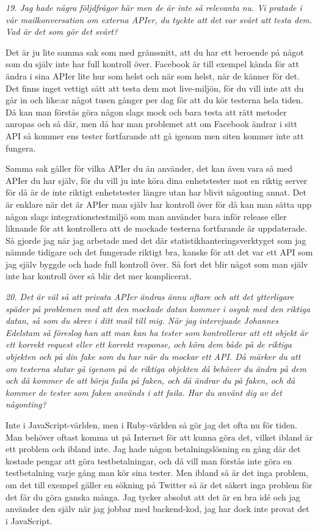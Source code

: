 \documentclass[11pt]{article}
\begin{document}
\emph{19. Jag hade några följdfrågor här men de är inte så relevanta nu. Vi pratade i vår mailkonversation om externa APIer, du tyckte att det var svårt att testa dem. Vad är det som gör det svårt?}

Det är ju lite samma sak som med gränssnitt, att du har ett beroende på något som du själv inte har full kontroll över. Facebook är till exempel kända för att ändra i sina APIer lite hur som helst och när som helst, när de känner för det. Det finns inget vettigt sätt att testa dem mot live-miljön, för du vill inte att du går in och like:ar något tusen gånger per dag för att du kör testerna hela tiden. Då kan man förstås göra någon slags mock och bara testa att rätt metoder anropas och så där, men då har man problemet att om Facebook ändrar i sitt API så kommer ens tester fortfarande att gå igenom men siten kommer inte att fungera.

Samma sak gäller för vilka APIer du än använder, det kan även vara så med APIer du har själv, för du vill ju inte köra dina enhetstester mot en riktig server för då är de inte riktigt enhetstester längre utan har blivit någonting annat. Det är enklare när det är APIer man själv har kontroll över för då kan man sätta upp någon slags integrationstestmiljö som man använder bara inför release eller liknande för att kontrollera att de mockade testerna fortfarande är uppdaterade. Så gjorde jag när jag arbetade med det där statistikhanteringsverktyget som jag nämnde tidigare och det fungerade riktigt bra, kanske för att det var ett API som jag själv byggde och hade full kontroll över. Så fort det blir något som man själv inte har kontroll över så blir det mer komplicerat.

\emph{20. Det är väl så att privata APIer ändras ännu oftare och att det ytterligare späder på problemen med att den mockade datan kommer i osynk med den riktiga datan, så som du skrev i ditt mail till mig. När jag intervjuade Johannes Edelstam så föreslog han att man kan ha tester som kontrollerar att ett objekt är ett korrekt request eller ett korrekt response, och köra dem både på de riktiga objekten och på din fake som du har när du mockar ett API. Då märker du att om testerna slutar gå igenom på de riktiga objekten då behöver du ändra på dem och då kommer de att börja faila på faken, och då ändrar du på faken, och då kommer de tester som faken används i att faila. Har du använt dig av det någonting?}

Inte i JavaScript-världen, men i Ruby-världen så gör jag det ofta nu för tiden. Man behöver oftast komma ut på Internet för att kunna göra det, vilket ibland är ett problem och ibland inte. Jag hade någon betalningslösning en gång där det kostade pengar att göra testbetalningar, och då vill man förstås inte göra en testbetalning varje gång man kör sina tester. Men ibland så är det inga problem, om det till exempel gäller en sökning på Twitter så är det säkert inga problem för det får du göra ganska många. Jag tycker absolut att det är en bra idé och jag använder den själv när jag jobbar med backend-kod, jag har dock inte provat det i JavaScript.
\end{document}

